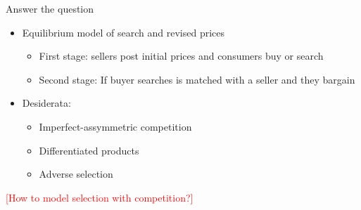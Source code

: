 \documentclass[10pt,aspectratio=169]{beamer}
\begin{document}
 
\begin{frame}{Answer the question}\label{slide:answer1}
    \begin{itemize}
        \item Equilibrium model of search and revised prices  
        \begin{itemize}
            \item First stage: sellers post initial prices and consumers buy or search 
            \item Second stage: If buyer searches is matched with a seller and they bargain
        \end{itemize}
        \item Desiderata:
        \begin{itemize}
           \item Imperfect-assymmetric competition\hyperlink{slide:fig2}{}
            \item Differentiated products   \hyperlink{slide:fig3}{}
            \item Adverse selection
        \end{itemize}
    \end{itemize}

    \textcolor{red}{[How to model selection with competition?]}
\end{frame}


    
\end{document}
